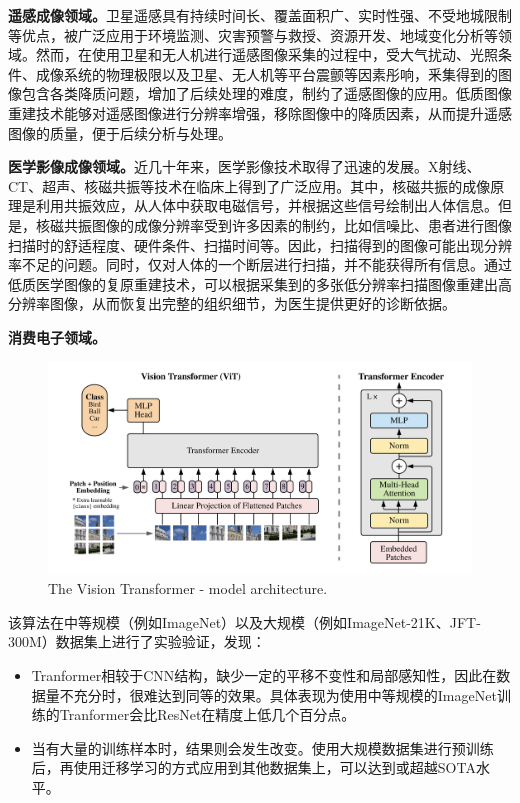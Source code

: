 \documentclass[letterpaper,10pt]{article}
\begin{document}
	\textbf{遥感成像领域。}卫星遥感具有持续时间长、覆盖面积广、实时性强、不受地城限制等优点，被广泛应用于环境监测、灾害预警与救授、资源开发、地域变化分析等领域。然而，在使用卫星和无人机进行遥感图像采集的过程中，受大气扰动、光照条件、成像系统的物理极限以及卫星、无人机等平台震颤等因素彤响，釆集得到的图像包含各类降质问题，增加了后续处理的难度，制约了遥感图像的应用。低质图像重建技术能够对遥感图像进行分辨率增强，移除图像中的降质因素，从而提升遥感图像的质量，便于后续分析与处理。
	
	\textbf{医学影像成像领域。}近几十年来，医学影像技术取得了迅速的发展。X射线、CT、超声、核磁共振等技术在临床上得到了广泛应用。其中，核磁共振的成像原理是利用共振效应，从人体中获取电磁信号，并根据这些信号绘制出人体信息。但是，核磁共振图像的成像分辨率受到许多因素的制约，比如信噪比、患者进行图像扫描时的舒适程度、硬件条件、扫描时间等。因此，扫描得到的图像可能出现分辨率不足的问题。同时，仅对人体的一个断层进行扫描，并不能获得所有信息。通过低质医学图像的复原重建技术，可以根据采集到的多张低分辨率扫描图像重建出高分辨率图像，从而恢复出完整的组织细节，为医生提供更好的诊断依据。
	
	\textbf{消费电子领域。}
	
	
	\begin{figure}[htbp]
		\centering 
		\includegraphics[width=0.8\columnwidth]{picture/Vision-Transformer-architecture}
		\caption{
			\label{fig: Vision Transformer} The Vision Transformer - model architecture.
		}
	\end{figure}
	
	
	该算法在中等规模（例如ImageNet）以及大规模（例如ImageNet-21K、JFT-300M）数据集上进行了实验验证，发现：
	
	\begin{itemize}
		\item {}
			Tranformer相较于CNN结构，缺少一定的平移不变性和局部感知性，因此在数据量不充分时，很难达到同等的效果。具体表现为使用中等规模的ImageNet训练的Tranformer会比ResNet在精度上低几个百分点。
		\item {}
			当有大量的训练样本时，结果则会发生改变。使用大规模数据集进行预训练后，再使用迁移学习的方式应用到其他数据集上，可以达到或超越SOTA水平。
	\end{itemize}
	
\end{document}
